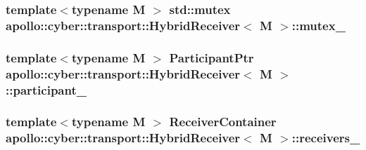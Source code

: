 \hypertarget{classapollo_1_1cyber_1_1transport_1_1HybridReceiver_acd72be19a7680b7c7e87593e7803f016}{
\subsubsection[{mutex\-\_\-}]{\setlength{\rightskip}{0pt plus 5cm}template$<$typename M $>$ std\-::mutex {\bf apollo\-::cyber\-::transport\-::\-Hybrid\-Receiver}$<$ M $>$\-::mutex\-\_\-\hspace{0.3cm}{\ttfamily [private]}}}\label{classapollo_1_1cyber_1_1transport_1_1HybridReceiver_acd72be19a7680b7c7e87593e7803f016}
\hypertarget{classapollo_1_1cyber_1_1transport_1_1HybridReceiver_ae166879e80acc07e56f178f50eac3fd4}{
\subsubsection[{participant\-\_\-}]{\setlength{\rightskip}{0pt plus 5cm}template$<$typename M $>$ {\bf Participant\-Ptr} {\bf apollo\-::cyber\-::transport\-::\-Hybrid\-Receiver}$<$ M $>$\-::participant\-\_\-\hspace{0.3cm}{\ttfamily [private]}}}\label{classapollo_1_1cyber_1_1transport_1_1HybridReceiver_ae166879e80acc07e56f178f50eac3fd4}
\hypertarget{classapollo_1_1cyber_1_1transport_1_1HybridReceiver_a1f74e7e19cf92397729389922da60d57}{
\subsubsection[{receivers\-\_\-}]{\setlength{\rightskip}{0pt plus 5cm}template$<$typename M $>$ {\bf Receiver\-Container} {\bf apollo\-::cyber\-::transport\-::\-Hybrid\-Receiver}$<$ M $>$\-::receivers\-\_\-\hspace{0.3cm}{\ttfamily [private]}}}\label{classapollo_1_1cyber_1_1transport_1_1HybridReceiver_a1f74e7e19cf92397729389922da60d57}
